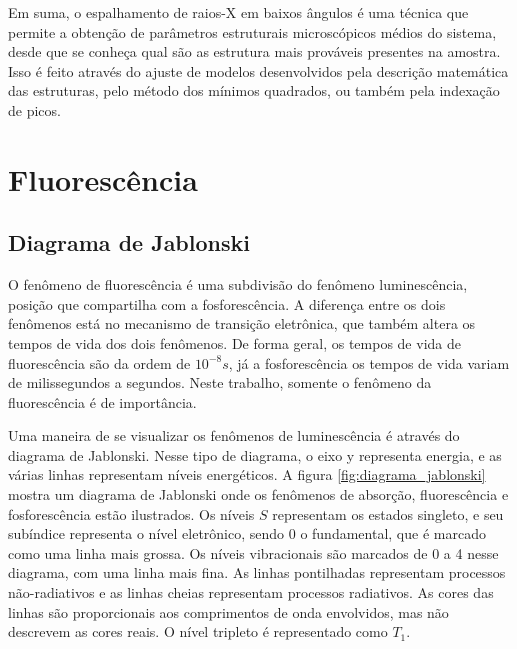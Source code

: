 		Em suma, o espalhamento de raios-X em baixos ângulos é uma técnica que permite a obtenção de parâmetros estruturais microscópicos médios do sistema, desde que se conheça qual são as estrutura mais prováveis presentes na amostra. Isso é feito através do ajuste de modelos desenvolvidos pela descrição matemática das estruturas, pelo método dos mínimos quadrados, ou também pela indexação de picos.
		
	\chapter{Fluorescência} 
		\section{Diagrama de Jablonski} 
		
		O fenômeno de fluorescência é uma subdivisão do fenômeno luminescência, posição que compartilha com a fosforescência. A diferença entre os dois fenômenos está no mecanismo de transição eletrônica, que também altera os tempos de vida dos dois fenômenos. De forma geral, os tempos de vida de fluorescência são da ordem de \(10^{-8} s\), já a fosforescência os tempos de vida variam de milissegundos a segundos. Neste trabalho, somente o fenômeno da fluorescência é de importância.
		
		Uma maneira de se visualizar os fenômenos de luminescência é através do diagrama de Jablonski. Nesse tipo de diagrama, o eixo y representa energia, e as várias linhas representam níveis energéticos. A figura \ref{fig:diagrama_jablonski} mostra um diagrama de Jablonski onde os fenômenos de absorção, fluorescência e fosforescência estão ilustrados. Os níveis \(S\) representam os estados singleto, e seu subíndice representa o nível eletrônico, sendo 0 o fundamental, que é marcado como uma linha mais grossa. Os níveis vibracionais são marcados de 0 a 4 nesse diagrama, com uma linha mais fina. As linhas pontilhadas representam processos não-radiativos e as linhas cheias representam processos radiativos.   As cores das linhas são proporcionais aos comprimentos de onda envolvidos, mas não descrevem as cores reais. O nível tripleto é representado como \(T_1\).  %
		
